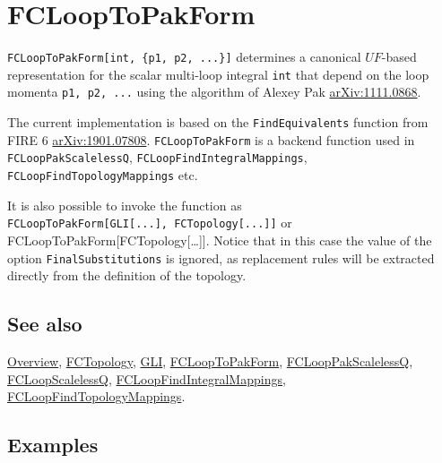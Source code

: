 \documentclass[../FeynCalcManual.tex]{subfiles}
\begin{document}
\hypertarget{fclooptopakform}{
\section{FCLoopToPakForm}\label{fclooptopakform}}

\texttt{FCLoopToPakForm[\allowbreak{}int,\ \allowbreak{}\{\allowbreak{}p1,\ \allowbreak{}p2,\ \allowbreak{}...\}]}
determines a canonical \(UF\)-based representation for the scalar
multi-loop integral \texttt{int} that depend on the loop momenta
\texttt{p1,\ \allowbreak{}p2,\ \allowbreak{}...} using the algorithm of
Alexey Pak \href{https://arxiv.org/abs/1111.0868}{arXiv:1111.0868}.

The current implementation is based on the \texttt{FindEquivalents}
function from FIRE 6
\href{https://arxiv.org/abs/1901.07808}{arXiv:1901.07808}.
\texttt{FCLoopToPakForm} is a backend function used in
\texttt{FCLoopPakScalelessQ}, \texttt{FCLoopFindIntegralMappings},
\texttt{FCLoopFindTopologyMappings} etc.

It is also possible to invoke the function as
\texttt{FCLoopToPakForm[\allowbreak{}GLI[\allowbreak{}...],\ \allowbreak{}FCTopology[\allowbreak{}...]]}
or FCLoopToPakForm{[}FCTopology{[}\ldots{]}{]}. Notice that in this case
the value of the option \texttt{FinalSubstitutions} is ignored, as
replacement rules will be extracted directly from the definition of the
topology.

\subsection{See also}

\hyperlink{toc}{Overview}, \hyperlink{fctopology}{FCTopology},
\hyperlink{gli}{GLI}, \hyperlink{fclooptopakform}{FCLoopToPakForm},
\hyperlink{fclooppakscalelessq}{FCLoopPakScalelessQ},
\hyperlink{fcloopscalelessq}{FCLoopScalelessQ},
\hyperlink{fcloopfindintegralmappings}{FCLoopFindIntegralMappings},
\hyperlink{fcloopfindtopologymappings}{FCLoopFindTopologyMappings}.

\subsection{Examples}
\end{document}
